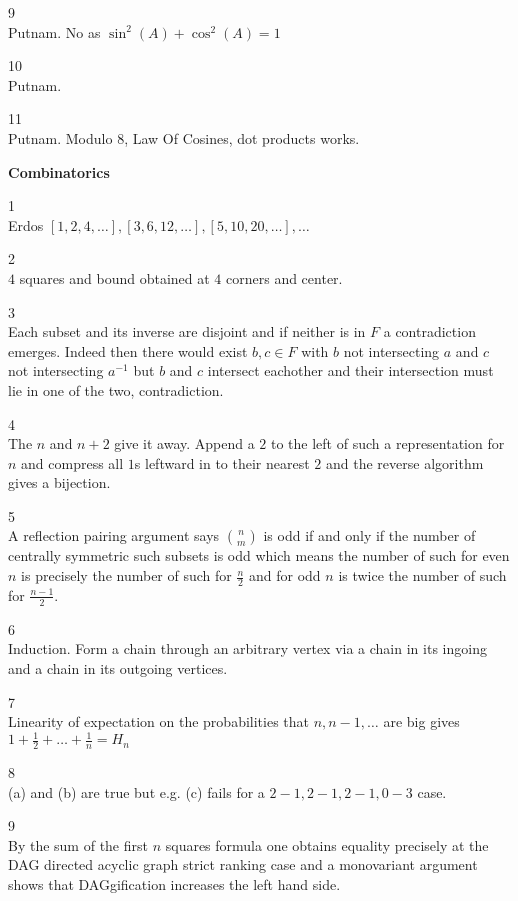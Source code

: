 9 \\
Putnam. $\boxed{\text{No}}$ as $\sin^2 (A)+\cos^2 (A)=1$

10 \\
Putnam.

11 \\
Putnam. Modulo $8$, Law Of Cosines, dot products works.

\newpage

\textbf{Combinatorics}

1 \\
Erdos $[1,2,4,\dots],[3,6,12,\dots],[5,10,20,\dots],\dots$

2 \\
$4$ squares and bound obtained at $4$ corners and center.

3 \\
Each subset and its inverse are disjoint and if neither is in $F$ a contradiction emerges. Indeed then there would exist $b,c \in F$ with $b$ not intersecting $a$ and $c$ not intersecting $a^{-1}$ but $b$ and $c$ intersect eachother and their intersection must lie in one of the two, contradiction.

4 \\
The $n$ and $n+2$ give it away. Append a $2$ to the left of such a representation for $n$ and compress all $1$s leftward in to their nearest $2$ and the reverse algorithm gives a bijection.

5 \\
A reflection pairing argument says $\binom{n}{m}$ is odd if and only if the number of centrally symmetric such subsets is odd which means the number of such for even $n$ is precisely the number of such for $\frac{n}{2}$ and for odd $n$ is twice the number of such for $\frac{n-1}{2}$.

6 \\
Induction. Form a chain through an arbitrary vertex via a chain in its ingoing and a chain in its outgoing vertices.

7 \\
Linearity of expectation on the probabilities that $n,n-1,\dots$ are big gives $\boxed{1+\frac{1}{2}+\dots+\frac{1}{n}=H_n}$

8 \\
(a) and (b) are true but e.g. (c) fails for a $2-1,2-1,2-1,0-3$ case.

9 \\
By the sum of the first $n$ squares formula one obtains equality precisely at the DAG directed acyclic graph strict ranking case and a monovariant argument shows that DAGgification increases the left hand side.

